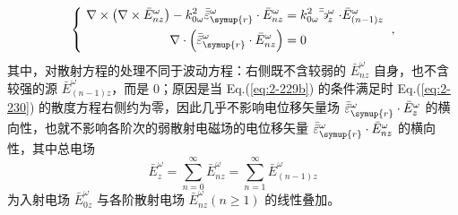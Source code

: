 \begin{equation} \label{eq:2-231}
	\left\{\ \begin{aligned} \nabla \times \left( \nabla \times \bar{E}^{\omega}_{nz} \right) - k^{2}_{0\omega} \bar{\bar{\varepsilon}}^{\omega}_{\symup{r}} \cdot \bar{E}^{\omega}_{nz} &= k^{2}_{0\omega} \bar{\bar{\backepsilon}}^{\omega}_{z} \cdot \bar{E}^{\omega}_{(n-1)z} \\ \nabla \cdot \left( \bar{\bar{\varepsilon}}^{\omega}_{\symup{r}} \cdot \bar{E}^{\omega}_{nz} \right) &= 0 \end{aligned}\right. ~,
\end{equation}
其中，对散射方程的处理不同于波动方程：右侧既不含较弱的 $\bar{E}^{\omega}_{nz}$ 自身，也不含较强的源 $\bar{E}^{\omega}_{(n-1)z}$，而是 $0$；原因是当 Eq.(\ref{eq:2-229b}) 的条件满足时 Eq.(\ref{eq:2-230}) 的散度方程右侧约为零，因此几乎不影响电位移矢量场 $\bar{\bar{\varepsilon}}^{\omega}_{\symup{r}} \cdot \bar{E}^{\omega}_z$ 的横向性，也就不影响各阶次的弱散射电磁场的电位移矢量 $\bar{\bar{\varepsilon}}^{\omega}_{\symup{r}} \cdot \bar{E}^{\omega}_{nz}$ 的横向性，其中总电场
\begin{equation} \label{eq:2-232}
	\bar{E}^{\omega}_z = \sum_{n=0}^{\infty} \bar{E}^{\omega}_{nz} = \sum_{n=1}^{\infty} \bar{E}^{\omega}_{\left( n - 1 \right)z}
\end{equation}
为入射电场 $\bar{E}^{\omega}_{0z}$ 与各阶散射电场 $\bar{E}^{\omega}_{nz} \left( n \geq 1 \right)$ 的线性叠加。

